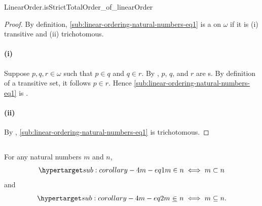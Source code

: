 \documentclass{report}
\newcommand{\ineq}{\,\mathop{\underline{\in}}\,}
\begin{document}
    {LinearOrder.isStrictTotalOrder\_of\_linearOrder}

  \begin{proof}

    By definition, \eqref{sub:linear-ordering-natural-numbers-eq1} is a
       on $\omega$ if it is (i) transitive and
      (ii) trichotomous.

    \paragraph{(i)}%

      Suppose $p, q, r \in \omega$ such that $p \in q$ and $q \in r$.
      By , $p$, $q$, and $r$ are
        s.
      By definition of a transitive set, it follows $p \in r$.
      Hence \eqref{sub:linear-ordering-natural-numbers-eq1} is
        .

    \paragraph{(ii)}%

      By ,
        \eqref{sub:linear-ordering-natural-numbers-eq1} is trichotomous.

  \end{proof}

\subsection{}%

  \begin{corollary}[4M]
    For any natural numbers $m$ and $n$,
      \begin{equation}
        \hyperlabel{sub:corollary-4m-eq1}
        m \in n \iff m \subset n
      \end{equation}
      and
      \begin{equation}
        \hyperlabel{sub:corollary-4m-eq2}
        m \ineq n \iff m \subseteq n.
      \end{equation}
  \end{corollary}
\end{document}
